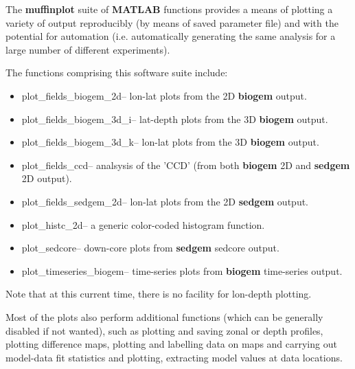 \documentclass[11pt,fleqn]{book} %
\begin{document}
\noindent The \textbf{muffinplot} suite of \textbf{MATLAB} functions provides a means of plotting a variety of output reproducibly (by means of  saved parameter file) and with the potential for automation (i.e. automatically generating the same analysis for a large number of different experiments).

The functions comprising this software suite include:

\begin{itemize}[noitemsep]
\vspace{1mm}
\item \footnotesize\textsf{plot\_fields\_biogem\_2d}\normalsize -- lon-lat plots from the 2D \textbf{biogem} output.
\vspace{1mm}
\item \footnotesize\textsf{plot\_fields\_biogem\_3d\_i}\normalsize -- lat-depth plots from the 3D \textbf{biogem} output. 
\vspace{1mm}
\item \footnotesize\textsf{plot\_fields\_biogem\_3d\_k}\normalsize -- lon-lat plots from the 3D \textbf{biogem} output.
\vspace{1mm}
\item \footnotesize\textsf{plot\_fields\_ccd}\normalsize -- analsysis of the 'CCD' (from both \textbf{biogem} 2D and \textbf{sedgem} 2D output).
\vspace{1mm}
\item \footnotesize\textsf{plot\_fields\_sedgem\_2d}\normalsize -- lon-lat plots from the 2D \textbf{sedgem} output.
\vspace{1mm}
\item \footnotesize\textsf{plot\_histc\_2d}\normalsize -- a generic color-coded histogram function.
\vspace{1mm}
\item \footnotesize\textsf{plot\_sedcore}\normalsize -- down-core plots from \textbf{sedgem} sedcore output.
\vspace{1mm}
\item \footnotesize\textsf{plot\_timeseries\_biogem}\normalsize -- time-series plots from \textbf{biogem} time-series output.
\end{itemize}
Note that at this current time, there is no facility for lon-depth plotting.

Most of the plots also perform additional functions (which can be generally disabled if not wanted), such as plotting and saving zonal or depth profiles, plotting difference maps, plotting and labelling data on maps and carrying out model-data fit statistics and plotting, extracting model values at data locations.
\end{document}

